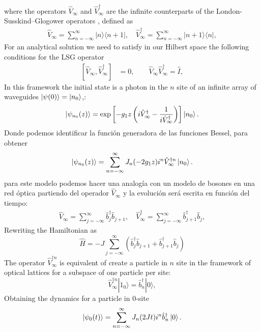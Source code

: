 \documentclass[a4paper, amsfonts, amssymb, amsmath, reprint, showkeys, nofootinbib ,twoside]{revtex4-2}
\begin{document}
where the operators $\hat{V}_\infty$ and $\hat{V}^\dagger_\infty$ are the infinite counterparts of the London-Susskind–Glogower operators
\cite{London1926, Susskind1964}, defined as
\begin{align}
      \hat{V}_\infty = \sum_{n=-\infty}^{\infty} |n\rangle \langle n+1|, 
\quad \hat{V}_\infty^\dagger = \sum_{n=-\infty}^{\infty} |n+1\rangle \langle n|, 
\end{align}
For an analytical solution we need to satisfy in our Hilbert space the following conditions for the LSG operator
\begin{align*}
    \left[\hat{V}_\infty, \hat{V}_\infty^\dagger\right] &= 0, \qquad \hat{V}_\infty \hat{V}_\infty^\dagger = \hat{I},
\end{align*}
In this framework the initial state is a photon in the $n$ site of an infinite array of waveguides $\ket{\psi(0)} = \ket{n_0}$,:
\[
\ket{\psi_{n_0}(z)} = \exp\left[-g_1 z \left(i\hat{V}_\infty^\dagger - \frac{1}{i\hat{V}_\infty^\dagger}\right)\right] \ket{n_0}.
\]
Donde podemos identificar la función generadora de las funciones Bessel, para obtener
\[
\ket{\psi_{n_0}(z)} = \sum_{n=-\infty}^{\infty} J_n(-2g_1 z)i^n \hat{V}_\infty^{\dagger n} \ket{n_0}.
\] 
para este modelo podemos hacer una analogía con un modelo de bosones en una red óptica partiendo del operador $\hat{V}_\infty$ y la evolución será escrita en función del tiempo:
\begin{align}
\hat{V}_\infty = \sum_{j=-\infty}^{\infty} \hat{b}_j^\dagger  \hat{b}_{j+1}, \quad \hat{V}_\infty^\dagger = \sum_{j=-\infty}^{\infty} \hat{b}_{j+1}^\dagger \hat{b}_{j} ,
\end{align}
Rewriting the Hamiltonian as 
\begin{equation}\label{NewHamiBos}
\hat{H} = -J \sum_{j=-\infty}^\infty \left( \hat{b}_j^\dagger  \hat{b}_{j+1} + \hat{b}_{j+1}^\dagger \hat{b}_{j}  \right)
\end{equation} 
The operator $\hat{V}^{\dagger n}_\infty$ is equivalent of create a particle in $n$ site in the framework of optical lattices for a subspace of one particle per site:
\begin{equation}
\hat{V}^{\dagger n}_\infty |1_0\rangle = \hat{b}^\dagger_n |0\rangle, 
\end{equation}	
Obtaining the dynamics for a particle in $0$-site 
\begin{equation} 
\ket{\psi_{0}(t)} = \sum_{n=-\infty}^{\infty} J_n(2 J t)i^n \hat{b}_n^{\dagger	} \ket{0}.
\end{equation} 
\end{document}
